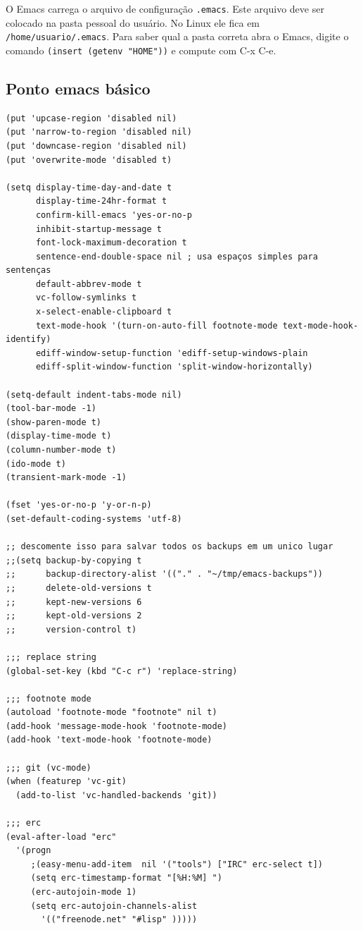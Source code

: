 \documentclass[12pt,brazil]{book}
\begin{document}
O Emacs carrega o arquivo de configuração \verb!.emacs!. Este arquivo
deve ser colocado na pasta pessoal do usuário. No Linux ele fica em
\verb!/home/usuario/.emacs!. Para saber qual a pasta correta abra o
Emacs, digite o comando \verb!(insert (getenv "HOME"))! e compute com
C-x C-e.

\subsection{Ponto emacs básico}
\label{sec:dot-emacs-basico}

\begin{verbatim}
(put 'upcase-region 'disabled nil)
(put 'narrow-to-region 'disabled nil)
(put 'downcase-region 'disabled nil)
(put 'overwrite-mode 'disabled t)

(setq display-time-day-and-date t
      display-time-24hr-format t
      confirm-kill-emacs 'yes-or-no-p
      inhibit-startup-message t
      font-lock-maximum-decoration t
      sentence-end-double-space nil ; usa espaços simples para sentenças
      default-abbrev-mode t
      vc-follow-symlinks t
      x-select-enable-clipboard t
      text-mode-hook '(turn-on-auto-fill footnote-mode text-mode-hook-identify)
      ediff-window-setup-function 'ediff-setup-windows-plain
      ediff-split-window-function 'split-window-horizontally)

(setq-default indent-tabs-mode nil)
(tool-bar-mode -1)
(show-paren-mode t)
(display-time-mode t)
(column-number-mode t)
(ido-mode t)
(transient-mark-mode -1)

(fset 'yes-or-no-p 'y-or-n-p) 
(set-default-coding-systems 'utf-8)

;; descomente isso para salvar todos os backups em um unico lugar
;;(setq backup-by-copying t
;;      backup-directory-alist '(("." . "~/tmp/emacs-backups"))
;;      delete-old-versions t
;;      kept-new-versions 6
;;      kept-old-versions 2
;;      version-control t)

;;; replace string
(global-set-key (kbd "C-c r") 'replace-string)

;;; footnote mode
(autoload 'footnote-mode "footnote" nil t)
(add-hook 'message-mode-hook 'footnote-mode)
(add-hook 'text-mode-hook 'footnote-mode)

;;; git (vc-mode)
(when (featurep 'vc-git)
  (add-to-list 'vc-handled-backends 'git))

;;; erc
(eval-after-load "erc"
  '(progn
     ;(easy-menu-add-item  nil '("tools") ["IRC" erc-select t])
     (setq erc-timestamp-format "[%H:%M] ")
     (erc-autojoin-mode 1)
     (setq erc-autojoin-channels-alist
	   '(("freenode.net" "#lisp" )))))


\end{verbatim}
\end{document}
